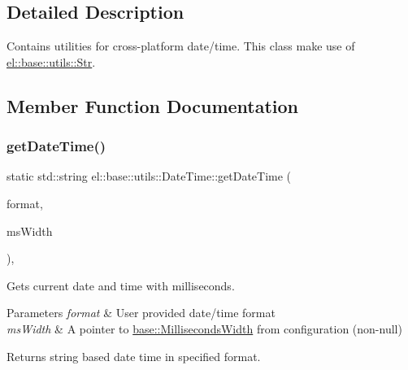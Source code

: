 \subsection{Detailed Description}
Contains utilities for cross-\/platform date/time. This class make use of \hyperlink{classel_1_1base_1_1utils_1_1_str}{el\+::base\+::utils\+::\+Str}. 

\subsection{Member Function Documentation}
\mbox{\label{classel_1_1base_1_1utils_1_1_date_time_aa813c606a98b8741f59ccdf5aacef733}} 
\subsubsection{\texorpdfstring{get\+Date\+Time()}{getDateTime()}}
{\footnotesize\ttfamily static std\+::string el\+::base\+::utils\+::\+Date\+Time\+::get\+Date\+Time (\begin{DoxyParamCaption}\item[{const char $\ast$}]{format,  }\item[{const \hyperlink{classel_1_1base_1_1_milliseconds_width}{base\+::\+Milliseconds\+Width} $\ast$}]{ms\+Width }\end{DoxyParamCaption})\hspace{0.3cm}{\ttfamily [inline]}, {\ttfamily [static]}}



Gets current date and time with milliseconds. 


\begin{DoxyParams}{Parameters}
{\em format} & User provided date/time format \\
\hline
{\em ms\+Width} & A pointer to \hyperlink{classel_1_1base_1_1_milliseconds_width}{base\+::\+Milliseconds\+Width} from configuration (non-\/null) \\
\hline
\end{DoxyParams}
\begin{DoxyReturn}{Returns}
string based date time in specified format. 
\end{DoxyReturn}
\mbox{\label{classel_1_1base_1_1utils_1_1_date_time_ac000e6ecf705c2194a173d618ff4acfd}} 
